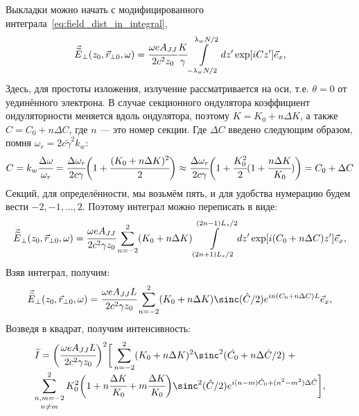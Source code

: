 Выкладки можно начать с модифицированного интеграла~\ref{eq:field_dist_in_integral}, 
\begin{equation}
\begin{array}{lcl}
\vec{\widetilde{E}}_{\bot}(z_0,  \vec{r}_{\bot 0}, \omega) =
\cfrac{\omega eA_{JJ}}{2c^2z_0}\cfrac{K}{\gamma}
\displaystyle\int\limits_{-\lambda_w N/2}^{\lambda_w N/2} dz'
\exp[iCz'] 	\vec{e}_x,
\end{array}	
\end{equation} 
Здесь, для простоты изложения, излучение рассматривается на оси, т.е. $\theta = 0$ от уединённого электрона. В случае секционного ондулятора коэффициент ондуляторности меняется вдоль ондулятора, поэтому $K = K_0 + n\Delta K$, а также $C = C_0 + n\Delta C$, где $n$ --- это номер секции. Где $\Delta {C}$ введено следующим образом, помня $\omega_r = 2c\widetilde{\gamma}^2k_w$:
\begin{equation}
C =k_w\cfrac{\Delta \omega}{\omega_r} = \cfrac{\Delta \omega_r}{2c\gamma}\bigg(1 + \cfrac{(K_0 + n\Delta K)^2}{2}\bigg) \approx \cfrac{\Delta \omega_r}{2c\gamma}\bigg(1 + \cfrac{K^2_0}{2}(1 + \cfrac{n\Delta K}{K_0})\bigg) = C_0 + \Delta C
\end{equation} 
Секций, для определённости, мы возьмём пять, и для удобства нумерацию будем вести $-2, -1, ... , 2$. Поэтому интеграл можно переписать в виде:
\begin{equation}
\begin{array}{lcl}
\vec{\widetilde{E}}_{\bot}(z_0,  \vec{r}_{\bot 0}, \omega) =
\cfrac{\omega eA_{JJ}}{2c^2 \gamma z_0}
\displaystyle\sum\limits_{n =-2}^{2}(K_0 + n\Delta K)
\displaystyle\int\limits_{(2n + 1)L_s/2}^{(2n - 1)L_s/2} dz'
\exp[i(C_0 + n\Delta C)z']	\vec{e}_x,
\end{array}	
\end{equation} 
Взяв интеграл, получим:
\begin{equation}
\begin{array}{lcl}
\vec{\widetilde{E}}_{\bot}(z_0,  \vec{r}_{\bot 0}, \omega) =
\cfrac{\omega eA_{JJ} L}{2c^2 \gamma z_0}
\displaystyle\sum\limits_{n =-2}^{2}(K_0 + n\Delta K)
\sinc(\hat{C}/2)e^{in({C}_0 + n\Delta {C})L}	\vec{e}_x,
\end{array}	
\end{equation} 
Возведя в квадрат, получим интенсивность:
\begin{equation}
\begin{array}{lcl}
{\widetilde{I}} =
\bigg(\cfrac{\omega eA_{JJ} L}{2c^2 \gamma z_0}\bigg)^2\bigg[
\displaystyle\sum\limits_{n =-2}^{2}(K_0 + n\Delta K)^2\sinc^2(\hat{C_0} + n\Delta \hat{C}/2) \; + \\

\displaystyle\mathop{\sum\limits_{n, m =-2}^{2}}_{n \neq m}K^2_0\bigg(1 + n\cfrac{\Delta K}{K_0} + m\cfrac{\Delta K}{K_0}\bigg)
\sinc^2(\hat{C}/2)e^{i(n-m)\hat{C}_0 + (n^2 - m^2)\Delta \hat{C}}\bigg],
\end{array}	
\end{equation} 
